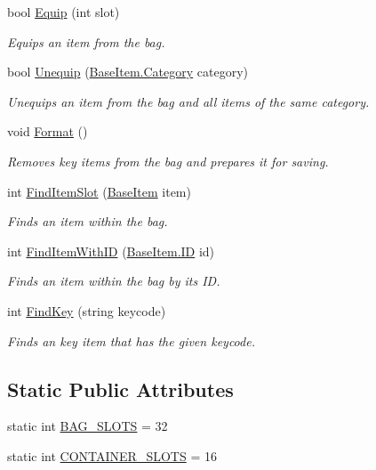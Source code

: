 \begin{DoxyCompactItemize}
bool \mbox{\hyperlink{class_bag_a975e4ef7a5647327225e5b587b32c066}{Equip}} (int slot)
\begin{DoxyCompactList}\small\item\em Equips an item from the bag. \end{DoxyCompactList}\item 
bool \mbox{\hyperlink{class_bag_aacb4579a06f66e1578327635e2120b3e}{Unequip}} (\mbox{\hyperlink{class_base_item_a882a2962396f880c2e23755437245d37}{Base\+Item.\+Category}} category)
\begin{DoxyCompactList}\small\item\em Unequips an item from the bag and all items of the same category. \end{DoxyCompactList}\item 
void \mbox{\hyperlink{class_bag_a3ee41396e25179a9c975c6f90d601bdd}{Format}} ()
\begin{DoxyCompactList}\small\item\em Removes key items from the bag and prepares it for saving. \end{DoxyCompactList}\item 
int \mbox{\hyperlink{class_bag_a0f77c6c4e4e4782d81256fa81e7d18f4}{Find\+Item\+Slot}} (\mbox{\hyperlink{class_base_item}{Base\+Item}} item)
\begin{DoxyCompactList}\small\item\em Finds an item within the bag. \end{DoxyCompactList}\item 
int \mbox{\hyperlink{class_bag_a089ef28af0c9fe39cc430b1826a313a7}{Find\+Item\+With\+ID}} (\mbox{\hyperlink{class_base_item_add9920d2f5a4fa91752714a8f3ab424b}{Base\+Item.\+ID}} id)
\begin{DoxyCompactList}\small\item\em Finds an item within the bag by its ID. \end{DoxyCompactList}\item 
int \mbox{\hyperlink{class_bag_ab913ca67bac7d4a740a470dbb1632311}{Find\+Key}} (string keycode)
\begin{DoxyCompactList}\small\item\em Finds an key item that has the given keycode. \end{DoxyCompactList}\end{DoxyCompactItemize}
\subsection*{Static Public Attributes}
\begin{DoxyCompactItemize}
\item 
static int \mbox{\hyperlink{class_bag_aa3277af2938bf5bc9447535318668ced}{B\+A\+G\+\_\+\+S\+L\+O\+TS}} = 32
\item 
static int \mbox{\hyperlink{class_bag_ac513120e71acce6fffca5d0e78733182}{C\+O\+N\+T\+A\+I\+N\+E\+R\+\_\+\+S\+L\+O\+TS}} = 16
\end{DoxyCompactItemize}
